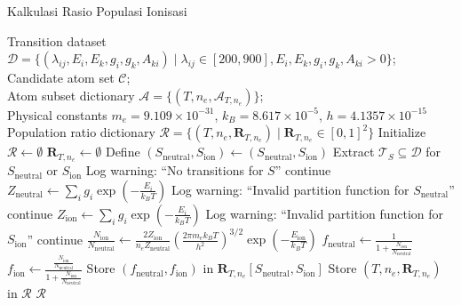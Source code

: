 \label{app:algo2}
\begin{algoritma}[h]
\small
\caption{Kalkulasi Rasio Populasi Ionisasi}
\begin{algorithmic}[1]
  \REQUIRE Transition dataset $\mathcal{D} = \{ (\lambda_{ij}, E_i, E_k, g_i, g_k, A_{ki}) \mid \lambda_{ij} \in [200, 900], E_i, E_k, g_i, g_k, A_{ki} > 0 \}$; \\ Candidate atom set $\mathcal{C}$; \\ Atom subset dictionary $\mathcal{A} = \{ (T, n_e, \mathcal{A}_{T,n_e}) \}$; \\ Physical constants $m_e = 9.109 \times 10^{-31}$, $k_B = 8.617 \times 10^{-5}$, $h = 4.1357 \times 10^{-15}$
  \ENSURE Population ratio dictionary $\mathcal{R} = \{ (T, n_e, \mathbf{R}_{T,n_e}) \mid \mathbf{R}_{T,n_e} \in [0, 1]^2 \}$
  \STATE Initialize $\mathcal{R} \gets \emptyset$ 
    \STATE $\mathbf{R}_{T,n_e} \gets \emptyset$ 
      \STATE Define $(S_{\text{neutral}}, S_{\text{ion}}) \gets (S_{\text{neutral}}, S_{\text{ion}})$ 
      \STATE Extract $\mathcal{T}_S \subseteq \mathcal{D}$ for $S_{\text{neutral}}$ or $S_{\text{ion}}$ 
        \STATE Log warning: ``No transitions for $S$'' 
        \STATE continue
      \ENDIF
      \STATE $Z_{\text{neutral}} \gets \sum_i g_i \exp\left(-\frac{E_i}{k_B T}\right)$ 
        \STATE Log warning: ``Invalid partition function for $S_{\text{neutral}}$'' 
        \STATE continue
      \ENDIF
      \STATE $Z_{\text{ion}} \gets \sum_i g_i \exp\left(-\frac{E_i}{k_B T}\right)$ 
        \STATE Log warning: ``Invalid partition function for $S_{\text{ion}}$'' 
        \STATE continue
      \ENDIF
      \STATE $\frac{N_{\text{ion}}}{N_{\text{neutral}}} \gets \frac{2 Z_{\text{ion}}}{n_e Z_{\text{neutral}}} \left( \frac{2\pi m_e k_B T}{h^2} \right)^{3/2} \exp\left(-\frac{E_{\text{ion}}}{k_B T}\right)$ 
      \STATE $f_{\text{neutral}} \gets \frac{1}{1 + \frac{N_{\text{ion}}}{N_{\text{neutral}}}}$ 
      \STATE $f_{\text{ion}} \gets \frac{\frac{N_{\text{ion}}}{N_{\text{neutral}}}}{1 + \frac{N_{\text{ion}}}{N_{\text{neutral}}}}$ 
      \STATE Store $(f_{\text{neutral}}, f_{\text{ion}})$ in $\mathbf{R}_{T,n_e}[S_{\text{neutral}}, S_{\text{ion}}]$ 
    \ENDFOR
    \STATE Store $(T, n_e, \mathbf{R}_{T,n_e})$ in $\mathcal{R}$ 
  \ENDFOR
  \RETURN $\mathcal{R}$ 
\end{algorithmic}
\end{algoritma}

